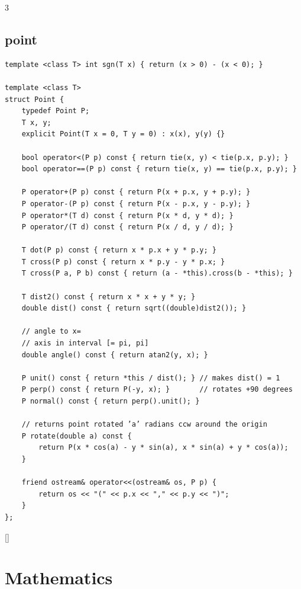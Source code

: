 \documentclass[twoside]{article}
\begin{document}
\begin{multicols*}{3}
{\subsection*{point}
}
\begin{verbatim}
template <class T> int sgn(T x) { return (x > 0) - (x < 0); }

template <class T>
struct Point {
    typedef Point P;
    T x, y;
    explicit Point(T x = 0, T y = 0) : x(x), y(y) {}

    bool operator<(P p) const { return tie(x, y) < tie(p.x, p.y); }
    bool operator==(P p) const { return tie(x, y) == tie(p.x, p.y); }

    P operator+(P p) const { return P(x + p.x, y + p.y); }
    P operator-(P p) const { return P(x - p.x, y - p.y); }
    P operator*(T d) const { return P(x * d, y * d); }
    P operator/(T d) const { return P(x / d, y / d); }

    T dot(P p) const { return x * p.x + y * p.y; }
    T cross(P p) const { return x * p.y - y * p.x; }
    T cross(P a, P b) const { return (a - *this).cross(b - *this); }

    T dist2() const { return x * x + y * y; }
    double dist() const { return sqrt((double)dist2()); }

    // angle to x=
    // axis in interval [= pi, pi]
    double angle() const { return atan2(y, x); }

    P unit() const { return *this / dist(); } // makes dist() = 1
    P perp() const { return P(-y, x); }       // rotates +90 degrees
    P normal() const { return perp().unit(); }

    // returns point rotated ’a’ radians ccw around the origin
    P rotate(double a) const {
        return P(x * cos(a) - y * sin(a), x * sin(a) + y * cos(a));
    }

    friend ostream& operator<<(ostream& os, P p) {
        return os << "(" << p.x << "," << p.y << ")";
    }
};

\end{verbatim}

{
[\vspace{2em}]
\section*{Mathematics}
}
{
}
\end{multicols*}
\end{document}
